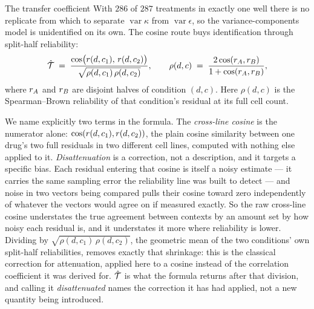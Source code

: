 \Needspace{216pt}
\begin{defn}{The transfer coefficient}
With $\num{286}$ of $\num{287}$ treatments in exactly one well there is
no replicate from which to separate $\operatorname{var}\kappa$ from
$\operatorname{var}\epsilon$, so the variance-components model is unidentified on
its own. The cosine route buys identification through split-half reliability:
\begin{equation}
 \hat{\mathcal{T}} \;=\; \frac{\cos\!\big(r(d,c_1),\, r(d,c_2)\big)}
 {\sqrt{\rho(d,c_1)\,\rho(d,c_2)}},
 \qquad
 \rho(d,c) \;=\; \frac{2\cos(r_A, r_B)}{1 + \cos(r_A, r_B)},
\end{equation}
where $r_A$ and $r_B$ are disjoint halves of condition $(d,c)$.
Here $\rho(d,c)$ is the Spearman--Brown reliability of that condition's residual at
its full cell count.
\end{defn}

We name explicitly two terms in the formula. The
\emph{cross-line cosine} is the numerator alone: $\cos(r(d,c_1), r(d,c_2))$,
the plain cosine similarity between one drug's two full residuals in two different
cell lines, computed with nothing else applied to it. \emph{Disattenuation} is a
correction, not a description, and it targets a specific bias. Each residual
entering that cosine is itself a noisy estimate --- it carries the same sampling
error the reliability line was built to detect --- and noise in two vectors being
compared pulls their cosine toward zero independently of whatever the vectors
would agree on if measured exactly. So the raw cross-line cosine understates the
true agreement between contexts by an amount set by how noisy each residual is,
and it understates it more where reliability is lower. Dividing by
$\sqrt{\rho(d,c_1)\,\rho(d,c_2)}$, the geometric mean of the two conditions' own
split-half reliabilities, removes exactly that shrinkage: this is the classical
correction for attenuation, applied here to a cosine instead of the correlation
coefficient it was derived for. $\hat{\mathcal{T}}$ is what the formula returns after
that division, and calling it \emph{disattenuated} names the correction it has had
applied, not a new quantity being introduced.

